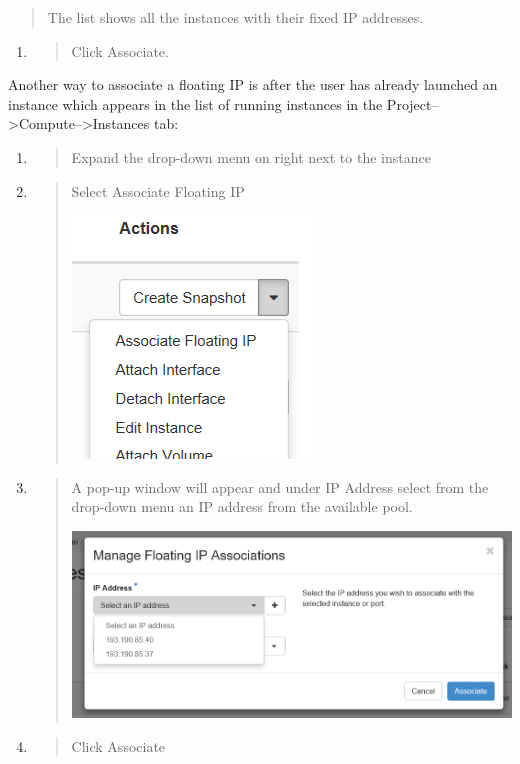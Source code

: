 \begin{quote}
The list shows all the instances with their fixed IP addresses.
\end{quote}

\begin{enumerate}
\def\labelenumi{\arabic{enumi}.}
\item
  \begin{quote}
  Click Associate.
  \end{quote}
\end{enumerate}


Another way to associate a floating IP is after the user has already launched an instance which appears in the list of running instances in the Project-->Compute-->Instances tab:

\begin{enumerate}
\def\labelenumi{\arabic{enumi}.}
\item
  \begin{quote}
  Expand the drop-down menu on right next to the instance
  \end{quote}
\item
  \begin{quote}
  Select Associate Floating IP
\begin{center}
\includegraphics[scale=0.7]{img/associate_IP_1.png}
\end{center}
  \end{quote}
\item
  \begin{quote}
  A pop-up window will appear and under IP Address select from the drop-down menu an IP address from the available pool.
\begin{center}
\includegraphics[scale=0.5]{img/associate_IP_2.png}
\end{center}
  \end{quote}
\item
  \begin{quote}
  Click Associate
  \end{quote}
\end{enumerate}


